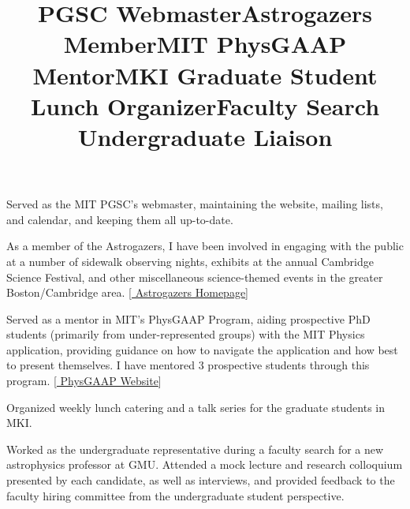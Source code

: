 \documentclass[marg, centered]{res}
\begin{document}
\begin{resume}
\title{\textbf{PGSC Webmaster}}
\begin{position}
Served as the MIT PGSC's webmaster, maintaining the website, mailing lists, and calendar, and keeping them all up-to-date.
\end{position}

\title{\textbf{Astrogazers Member}}
\begin{position}
As a member of the Astrogazers, I have been involved in engaging with the public at a number of sidewalk observing nights, exhibits at the annual Cambridge Science Festival, and other miscellaneous science-themed events in the greater Boston/Cambridge area. [\href{https://astrogazers.mit.edu/}{\color{dkbu} Astrogazers Homepage}]
\end{position}

\title{\textbf{MIT PhysGAAP Mentor}}
\begin{position}
Served as a mentor in MIT's PhysGAAP Program, aiding prospective PhD students (primarily from under-represented groups) with the MIT Physics application, providing guidance on how to navigate the application and how best to present themselves.  I have mentored 3 prospective students through this program. [\href{https://sites.mit.edu/physgaap/}{\color{dkbu} PhysGAAP Website}]
\end{position}

\title{\textbf{MKI Graduate Student Lunch Organizer}}
\begin{position}
Organized weekly lunch catering and a talk series for the graduate students in MKI.
\end{position}

\title{\textbf{Faculty Search Undergraduate Liaison}}
\begin{position}
Worked as the undergraduate representative during a faculty search for a new astrophysics professor at GMU. Attended a mock lecture and research colloquium presented by each candidate, as well as interviews, and provided feedback to the faculty hiring committee from the undergraduate student perspective.
\end{position}


\end{resume}
\end{document}
